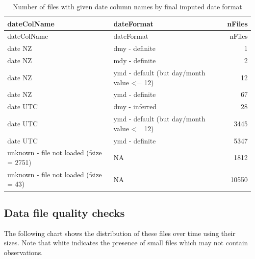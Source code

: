 \documentclass[]{article}
\begin{document}
\begin{longtable}[]{@{}llr@{}}
\caption{Number of files with given date column names by final imputed
date format}\tabularnewline
\toprule
dateColName & dateFormat & nFiles\tabularnewline
\midrule
\endfirsthead
\toprule
dateColName & dateFormat & nFiles\tabularnewline
\midrule
\endhead
date NZ & dmy - definite & 1\tabularnewline
date NZ & mdy - definite & 2\tabularnewline
date NZ & ymd - default (but day/month value \textless{}= 12) &
12\tabularnewline
date NZ & ymd - definite & 67\tabularnewline
date UTC & dmy - inferred & 28\tabularnewline
date UTC & ymd - default (but day/month value \textless{}= 12) &
3445\tabularnewline
date UTC & ymd - definite & 5347\tabularnewline
unknown - file not loaded (fsize = 2751) & NA & 1812\tabularnewline
unknown - file not loaded (fsize = 43) & NA & 10550\tabularnewline
\bottomrule
\end{longtable}

\subsection{Data file quality checks}\label{data-file-quality-checks}

The following chart shows the distribution of these files over time
using their sizes. Note that white indicates the presence of small files
which may not contain observations.
\end{document}
